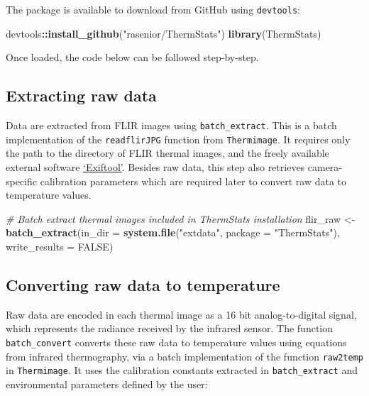 \documentclass[12pt,british,a4paper,]{article}
\newenvironment{Shaded}{\begin{snugshade}}{\end{snugshade}}
\newcommand{\CommentTok}[1]{\textcolor[rgb]{0.56,0.35,0.01}{\textit{#1}}}
\newcommand{\DataTypeTok}[1]{\textcolor[rgb]{0.13,0.29,0.53}{#1}}
\newcommand{\KeywordTok}[1]{\textcolor[rgb]{0.13,0.29,0.53}{\textbf{#1}}}
\newcommand{\NormalTok}[1]{#1}
\newcommand{\OperatorTok}[1]{\textcolor[rgb]{0.81,0.36,0.00}{\textbf{#1}}}
\newcommand{\OtherTok}[1]{\textcolor[rgb]{0.56,0.35,0.01}{#1}}
\newcommand{\StringTok}[1]{\textcolor[rgb]{0.31,0.60,0.02}{#1}}
\begin{document}
The package is available to download from GitHub using \texttt{devtools}:

\begin{Shaded}
\begin{Highlighting}[]
\NormalTok{devtools}\OperatorTok{::}\KeywordTok{install_github}\NormalTok{(}\StringTok{"rasenior/ThermStats"}\NormalTok{)}
\KeywordTok{library}\NormalTok{(ThermStats)}
\end{Highlighting}
\end{Shaded}

Once loaded, the code below can be followed step-by-step.

\hypertarget{extracting-raw-data}{%
\subsection{Extracting raw data}\label{extracting-raw-data}}

Data are extracted from FLIR images using \texttt{batch\_extract}. This is a batch implementation of the \texttt{readflirJPG} function from \texttt{Thermimage}. It requires only the path to the directory of FLIR thermal images, and the freely available external software \href{https://www.sno.phy.queensu.ca/~phil/exiftool/}{`Exiftool'}. Besides raw data, this step also retrieves camera-specific calibration parameters which are required later to convert raw data to temperature values.

\begin{Shaded}
\begin{Highlighting}[]
\CommentTok{# Batch extract thermal images included in ThermStats installation}
\NormalTok{flir_raw <-}
\StringTok{    }\KeywordTok{batch_extract}\NormalTok{(}\DataTypeTok{in_dir =} \KeywordTok{system.file}\NormalTok{(}\StringTok{"extdata"}\NormalTok{, }
                                       \DataTypeTok{package =} \StringTok{"ThermStats"}\NormalTok{),}
                  \DataTypeTok{write_results =} \OtherTok{FALSE}\NormalTok{)}
\end{Highlighting}
\end{Shaded}

\hypertarget{converting-raw-data-to-temperature}{%
\subsection{Converting raw data to temperature}\label{converting-raw-data-to-temperature}}

Raw data are encoded in each thermal image as a 16 bit analog-to-digital signal, which represents the radiance received by the infrared sensor. The function \texttt{batch\_convert} converts these raw data to temperature values using equations from infrared thermography, via a batch implementation of the function \texttt{raw2temp} in \texttt{Thermimage}. It uses the calibration constants extracted in \texttt{batch\_extract} and environmental parameters defined by the user:
\end{document}
